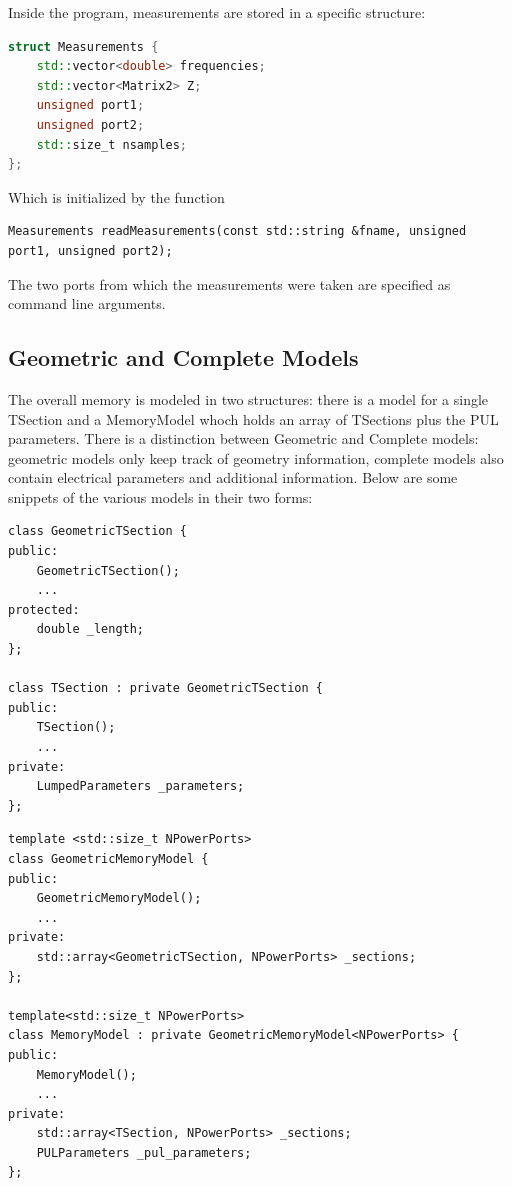 Inside the program, measurements are stored in a specific structure:
\begin{lstlisting}[language=C++]
struct Measurements {
    std::vector<double> frequencies;
    std::vector<Matrix2> Z;
    unsigned port1;
    unsigned port2;
    std::size_t nsamples;
};
\end{lstlisting}
Which is initialized by the function
\begin{lstlisting}
Measurements readMeasurements(const std::string &fname, unsigned port1, unsigned port2);
\end{lstlisting}
The two ports from which the measurements were taken are specified as command line arguments.

\subsection{Geometric and Complete Models}
The overall memory is modeled in two structures: there is a model for a single TSection and a MemoryModel whoch holds an array of TSections plus the PUL parameters. There is a distinction between Geometric and Complete models: geometric models only keep track of geometry information, complete models also contain electrical parameters and additional information. Below are some snippets of the various models in their two forms:

\begin{lstlisting}[title=Snippets for Geometric and Complete TSection]
class GeometricTSection {
public:
    GeometricTSection();
    ...
protected:
    double _length;
};

class TSection : private GeometricTSection {
public:
    TSection();
    ...
private:
    LumpedParameters _parameters;
};
\end{lstlisting}

\begin{lstlisting}[title=Snippets for Geometric and Complete MemoryModel]
template <std::size_t NPowerPorts>
class GeometricMemoryModel {
public:
    GeometricMemoryModel();
    ...
private:
    std::array<GeometricTSection, NPowerPorts> _sections;
};

template<std::size_t NPowerPorts>
class MemoryModel : private GeometricMemoryModel<NPowerPorts> {
public:
    MemoryModel();
    ...
private:
    std::array<TSection, NPowerPorts> _sections;
    PULParameters _pul_parameters;
};
\end{lstlisting}

